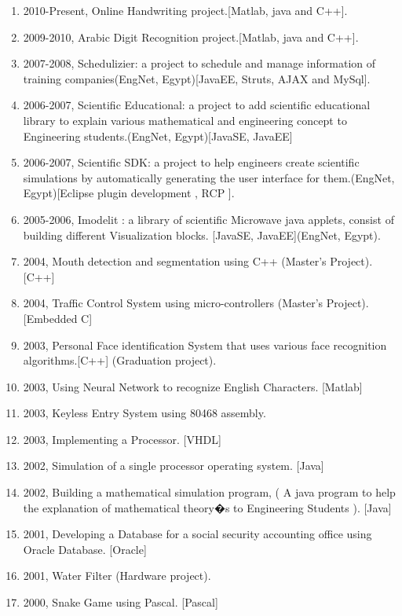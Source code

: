 \documentclass{article}
\begin{document}
 \begin{enumerate}
\item 2010-Present, Online Handwriting project.[Matlab, java and C++].
 \item 2009-2010, Arabic Digit Recognition project.[Matlab, java and C++].
\item 2007-2008, Schedulizier: a project to schedule and manage information of
training companies(EngNet, Egypt)[JavaEE, Struts, AJAX and MySql].
 \item 2006-2007, Scientific Educational:  a project to add scientific educational library to explain various mathematical and engineering concept to Engineering students.(EngNet, Egypt)[JavaSE, JavaEE]
 \item 2006-2007, Scientific SDK: a project to help engineers create scientific
 simulations by automatically generating the user interface for them.(EngNet,  Egypt)[Eclipse plugin development , RCP ].
 \item 2005-2006, Imodelit : a library of scientific Microwave java applets, consist of building different  Visualization  blocks. [JavaSE,  JavaEE](EngNet, Egypt).
 \item 2004, Mouth detection and segmentation using C++ (Master's Project).[C++]
 \item 2004, Traffic Control System using micro-controllers (Master's
 Project). [Embedded C]
 \item 2003, Personal Face identification System that uses various face recognition algorithms.[C++] (Graduation project).
 \item 2003, Using Neural Network to recognize English Characters. [Matlab]
 \item 2003, Keyless Entry System using 80468 assembly.
 \item 2003, Implementing a Processor. [VHDL]
 \item 2002, Simulation of a single processor operating system. [Java]
 \item 2002, Building a mathematical simulation program, ( A java program to help the explanation of mathematical theory�s to Engineering Students ). [Java]
 \item 2001, Developing a Database for a social security accounting office using Oracle Database. [Oracle]
 \item 2001, Water Filter (Hardware project).
 \item 2000, Snake Game using Pascal. [Pascal]
\end{enumerate}
\end{document}
